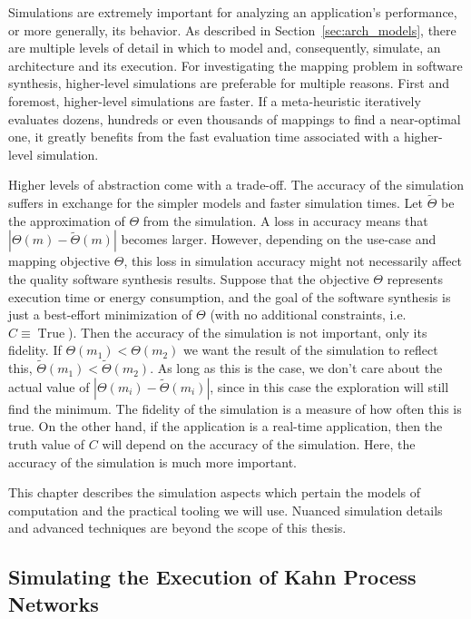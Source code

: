 Simulations are extremely important for analyzing an application's performance, or more generally, its behavior.
As described in Section~\ref{sec:arch_models}, there are multiple levels of detail in which to model and, consequently, simulate, an architecture and its execution.
For investigating the mapping problem in software synthesis, higher-level simulations are preferable for multiple reasons.
First and foremost, higher-level simulations are faster.
If a meta-heuristic iteratively evaluates dozens, hundreds or even thousands of mappings to find a near-optimal one, it greatly benefits from the fast evaluation time associated with a higher-level simulation.

Higher levels of abstraction come with a trade-off.
The accuracy of the simulation suffers in exchange for the simpler models and faster simulation times.
Let $\tilde \Theta$ be the approximation of $\Theta$ from the simulation. A loss in accuracy means that $| \Theta(m) - \tilde \Theta(m)|$ becomes larger.
However, depending on the use-case and mapping objective $\Theta$, this loss in simulation accuracy might not necessarily affect the quality software synthesis results.
Suppose that the objective $\Theta$ represents execution time or energy consumption, and the goal of the software synthesis is just a best-effort minimization of $\Theta$ (with no additional constraints, i.e. $C \equiv \operatorname{True}$).
Then the accuracy of the simulation is not important, only its fidelity.
If $\Theta(m_1) < \Theta(m_2)$ we want the result of the simulation to reflect this, $\tilde \Theta(m_1) < \tilde \Theta(m_2)$.
As long as this is the case, we don't care about the actual value of $| \Theta(m_i) - \tilde \Theta(m_i)|$, since in this case the exploration will still find the minimum.
The fidelity of the simulation is a measure of how often this is true.
On the other hand, if the application is a real-time application, then the truth value of $C$ will depend on the accuracy of the simulation.
Here, the accuracy of the simulation is much more important.

This chapter describes the simulation aspects which pertain the models of computation and the practical tooling we will use.
Nuanced simulation details and advanced techniques are beyond the scope of this thesis.

\subsection{Simulating the Execution of Kahn Process Networks}

